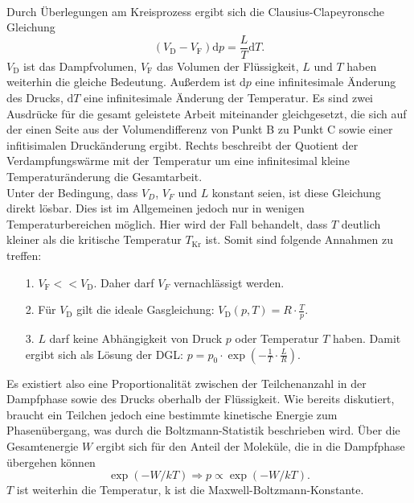 \\
Durch Überlegungen am Kreisprozess ergibt sich die Clausius-Clapeyronsche Gleichung 
\begin{equation}
    (V_\text{D}-V_\text{F})\text{d}p=\frac{L}{T}\text{d}T.
\end{equation}
$V_\text{D}$ ist das Dampfvolumen, $V_\text{F}$ das Volumen der Flüssigkeit, $L$ und $T$ haben weiterhin die gleiche Bedeutung.
Außerdem ist $\text{d}p$ eine infinitesimale Änderung des Drucks, $\text{d}T$ eine infinitesimale Änderung der Temperatur.
Es sind zwei Ausdrücke für die gesamt geleistete Arbeit miteinander gleichgesetzt, 
die sich auf der einen Seite aus der Volumendifferenz von Punkt B zu Punkt C sowie einer infitisimalen
Druckänderung ergibt.
Rechts beschreibt der Quotient der Verdampfungswärme mit der Temperatur um eine infinitesimal kleine
Temperaturänderung die Gesamtarbeit.\\
Unter der Bedingung, dass $V_D$, $V_F$ und $L$ konstant seien, ist diese Gleichung direkt lösbar. Dies ist im
Allgemeinen jedoch nur in wenigen Temperaturbereichen möglich. Hier wird der Fall behandelt, dass $T$ deutlich kleiner
als die kritische Temperatur $T_\text{Kr}$ ist.
\newpage \noindent
Somit sind folgende Annahmen zu treffen:
\begin{itemize}
    \item[1.] $V_\text{F}<<V_\text{D}$. Daher darf $V_F$ vernachlässigt werden.
    \item[2.] Für $V_\text{D}$ gilt die ideale Gasgleichung: $V_\text{D}(p,T)=R\cdot\frac{T}{p}$.
    \item[3.] $L$ darf keine Abhängigkeit von Druck $p$ oder Temperatur $T$ haben. Damit
    ergibt sich als Lösung der DGL: $p=p_0\cdot \exp(-\frac{1}{T}\cdot\frac{L}{R})$.
\end{itemize}
Es existiert also eine Proportionalität zwischen der Teilchenanzahl in der Dampfphase sowie
des Drucks oberhalb der Flüssigkeit. Wie bereits diskutiert, braucht ein Teilchen jedoch eine bestimmte
kinetische Energie zum Phasenübergang, was durch die Boltzmann-Statistik beschrieben wird.
Über die Gesamtenergie $W$ ergibt sich für den Anteil der Moleküle, die in die Dampfphase übergehen können
\begin{equation*}
\exp(-W/kT)\Rightarrow p\propto \exp(-W/kT).
\end{equation*}
$T$ ist weiterhin die Temperatur, k ist die Maxwell-Boltzmann-Konstante\cite{Boltzmann}.